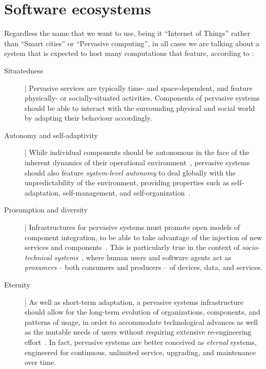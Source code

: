 \documentclass[12pt,a4paper,twoside,openright]{book}
\begin{document}
\section{Software ecosystems}

Regardless the name that we want to use, being it ``Internet of Things'' rather than ``Smart cities'' or ``Pervasive computing'', in all cases we are talking about a system that is expected to host many computations that feature, according to \cite{ker2014}:
\begin{description}
\item[Situatedness] | Pervasive services are typically time- and space-dependent, and feature physically- or socially-situated activities. Components of pervasive systems should be able to interact with the surrounding physical and social world by adapting their behaviour accordingly.
%
\item[Autonomy and self-adaptivity] | While individual components should be autonomous in the face of the inherent dynamics of their operational environment~\cite{agents-ieeecn6}, pervasive systems should also feature \emph{system-level autonomy} to deal globally with the unpredictability of the environment, providing properties such as self-adaptation, self-management, and self-organization~\cite{Mam06}.
%
\item[Prosumption and diversity] | Infrastructures for pervasive systems must promote open models of component integration, to be able to take advantage of the injection of new services and components~\cite{ZamO04}. This is particularly true in the context of \emph{socio-technical systems}~\cite{interactioncomplexity-iccci2013}, where human users and software agents act as \emph{prosumers} -- both consumers and producers -- of devices, data, and services.
%
\item[Eternity] | As well as short-term adaptation, a pervasive systems infrastructure should allow for the long-term evolution of organizations, components, and patterns of usage, in order to accommodate technological advances as well as the mutable needs of users without requiring extensive re-engineering effort~\cite{softwareevolution-iwpse2005}. In fact, pervasive systems are better conceived as \emph{eternal} systems, engineered for continuous, unlimited service, upgrading, and maintenance over time.
\end{description}
\end{document}
